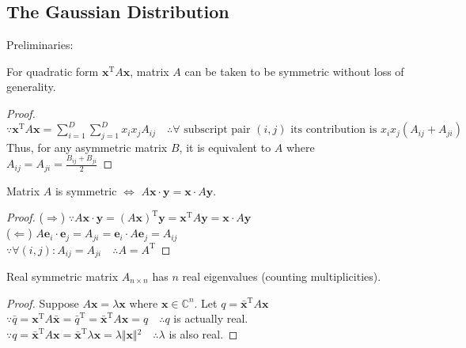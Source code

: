 \subsection{The Gaussian Distribution}
Preliminaries:
\begin{conclusion}
For quadratic form $\mathbf{x}^{\mathrm{T}}A\mathbf{x}$, matrix $A$ can be taken to be symmetric without loss of generality.
\end{conclusion}
\begin{proof}
$\because\mathbf{x}^{\mathrm{T}}A\mathbf{x}=\sum_{i=1}^{D}\sum_{j=1}^{D}x_{i}x_{j}A_{ij}\quad\therefore\forall\text{ subscript pair }(i,j)\text{ its contribution
is }x_{i}x_{j}(A_{ij}+A_{ji})$\\
Thus, for any asymmetric matrix $B$, it is equivalent to $A$ where
$A_{ij}=A_{ji}=\frac{B_{ij}+B_{ji}}{2}$
\end{proof}


\begin{conclusion}
Matrix $A$ is symmetric $\Leftrightarrow$
$A\mathbf{x}\cdot\mathbf{y}=\mathbf{x}\cdot{}A\mathbf{y}$.
\end{conclusion}
\begin{proof}
($\Rightarrow$)
    $\because{}A\mathbf{x}\cdot{}\mathbf{y}=(A\mathbf{x})^{\mathrm{T}}\mathbf{y}=\mathbf{x}^{\mathrm{T}}A\mathbf{y}=\mathbf{x}\cdot{}A\mathbf{y}$\\
($\Leftarrow$) $A\mathbf{e}_{i}\cdot{}\mathbf{e}_{j}=A_{ji}=\mathbf{e}_{i}\cdot{}A\mathbf{e}_{j}=A_{ij}$\\
$\because{}\forall{}(i,j):A_{ij}=A_{ji}\quad{}\therefore{}A=A^{\mathrm{T}}$
\end{proof}


\begin{conclusion}
Real symmetric matrix $A_{n\times{}n}$ has $n$ real eigenvalues (counting
        multiplicities).
\end{conclusion}
\begin{proof}
Suppose $A\mathbf{x}=\lambda{}\mathbf{x}$ where
$\mathbf{x}\in{}\mathbb{C}^{n}$. Let
$q=\bar{\mathbf{x}}^{\mathrm{T}}A\mathbf{x}$\\
$\because\bar{q}=\mathbf{x}^{\mathrm{T}}A\bar{\mathbf{x}}=\bar{q}^{\mathrm{T}}=\bar{\mathbf{x}}^{\mathrm{T}}A\mathbf{x}=q\quad{}\therefore{}q$
is actually real.\\
$\because{}q=\bar{\mathbf{x}}^{\mathrm{T}}A\mathbf{x}=\bar{\mathbf{x}}^{\mathrm{T}}\lambda{}\mathbf{x}=\lambda{}\Vert{}\mathbf{x}\Vert{}^{2}\quad{}\therefore{}\lambda{}$
is also real.
\end{proof}


